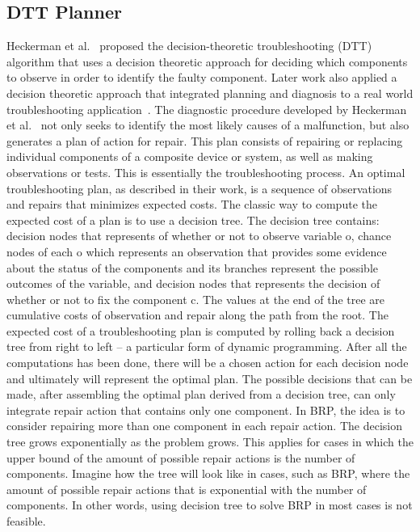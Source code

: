\documentclass[a4paper,11pt]{report}
\newcommand\roni[1]{\textcolor{green}{roni: #1}}
\begin{document}
\subsection{DTT Planner}


Heckerman et al.~\cite{heckerman1995decision} proposed the decision-theoretic troubleshooting (DTT) algorithm that uses a decision theoretic approach for deciding which components to observe in order to identify the faulty component. Later work also applied a decision theoretic approach that integrated planning and diagnosis to a real world troubleshooting application~\cite{Nyberg12,warnquist2009planning}. 
The diagnostic procedure developed by Heckerman et al.~\cite{heckerman1995decision} not only seeks to identify the most likely causes of a malfunction, but also generates a plan of action for repair. This plan consists of repairing or replacing individual components of a composite device or system, as well as making observations or tests. This is essentially the troubleshooting process. An optimal troubleshooting plan, as described in their work, is a sequence of observations and repairs that minimizes expected costs. The classic way to compute the expected cost of a plan is to use a decision tree. The decision tree contains: decision nodes that represents of whether or not to observe variable o, chance nodes of each o which represents an observation that provides some evidence about the status of the components and its branches represent the possible outcomes of the variable, and decision nodes that represents the decision of whether or not to fix the component c. The values at the end of the tree are cumulative costs of observation and repair along the path from the root. The expected cost of a troubleshooting plan is computed by rolling back a decision tree from right to left – a particular form of dynamic programming. After all the computations has been done, there will be a chosen action for each decision node and ultimately will represent the optimal plan. 
The possible decisions that can be made, after assembling the optimal plan derived from a decision tree, can only integrate repair action that contains only one component. In BRP, the idea is to consider repairing more than one component in each repair action. The decision tree grows exponentially as the problem grows. This applies for cases in which the upper bound of the amount of possible repair actions is the number of components. Imagine how the tree will look like in cases, such as BRP, where the amount of possible repair actions that is exponential with the number of components. In other words, using decision tree to solve BRP in most cases is not feasible. 
\end{document}
